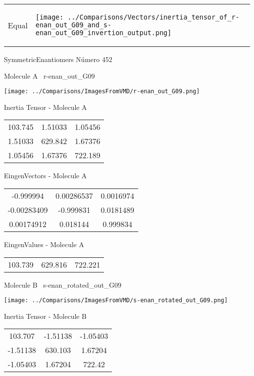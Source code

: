 \vtab[-5mm]
\begin{tabular}{*{2}{m{}}}
\begin{center}
\textcolor{NavyBlue}{\Large Equal}
\end{center}
&
\begin{center}
\texttt{[image: ../Comparisons/Vectors/inertia\_tensor\_of\_r-enan\_out\_G09\_and\_s-enan\_out\_G09\_invertion\_output.png]}
\end{center}
\end{tabular}

 \newpage

\vtab[-3cm]
\begin{center}
{\large SymmetricEnantiomers \tab Número 452}
\end{center}
\begin{multicols}{2}
\begin{center}

Molecule A \
r-enan\_out\_G09

\texttt{[image: ../Comparisons/ImagesFromVMD/r-enan\_out\_G09.png]}

Inertia Tensor - Molecule A \\
\begin{tabular}{|c c c|}
103.745	 & 	1.51033	 & 	1.05456	 \\
1.51033	 & 	629.842	 & 	1.67376	 \\
1.05456	 & 	1.67376	 & 	722.189
\end{tabular}

\vtab
 EingenVectors - Molecule A     \\
\begin{tabular}{|c c c|}
-0.999994	 & 	0.00286537	 & 	0.0016974	 \\
-0.00283409	 & 	-0.999831	 & 	0.0181489	 \\
0.00174912	 & 	0.018144	 & 	0.999834
\end{tabular}

\vtab
 EingenValues - Molecule A     \\
\begin{tabular}{|c c c|}
103.739	 & 	629.816	 & 	722.221	 \\
\end{tabular}
\columnbreak

Molecule B \
s-enan\_rotated\_out\_G09

\texttt{[image: ../Comparisons/ImagesFromVMD/s-enan\_rotated\_out\_G09.png]}

Inertia Tensor - Molecule B \\
\begin{tabular}{|c c c|}
103.707	 & 	-1.51138	 & 	-1.05403	 \\
-1.51138	 & 	630.103	 & 	1.67204	 \\
-1.05403	 & 	1.67204	 & 	722.42
\end{tabular}


\end{center}
\end{multicols}
